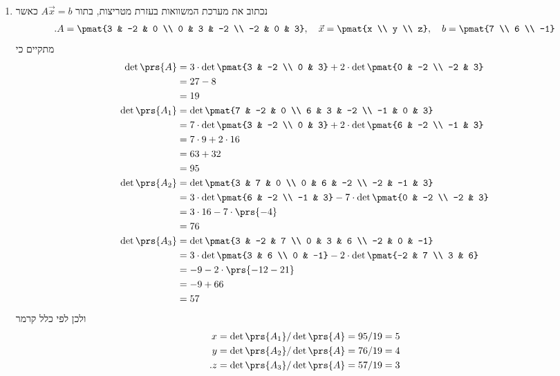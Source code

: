 \documentclass[a4paper,10pt,twoside,openany]{book}
\begin{document}
\begin{solution}
\begin{enumerate}
\item
נכתוב את מערכת המשוואות בעזרת מטריצות, בתור
$A\vec{x} = b$
כאשר
\begin{align*}
\text{.} A = \pmat{3 & -2 & 0 \\ 0 & 3 & -2 \\ -2 & 0 & 3}, \quad
\vec{x} = \pmat{x \\ y \\ z}, \quad
b = \pmat{7 \\ 6 \\ -1}
\end{align*}
מתקיים כי
\begin{align*}
\det\prs{A} &= 3 \cdot \det\pmat{3 & -2 \\ 0 & 3} + 2 \cdot \det \pmat{0 & -2 \\ -2 & 3}
\\&= 27 - 8
\\&= 19
\\
\det\prs{A_1} &= \det\pmat{7 & -2 & 0 \\ 6 & 3 & -2 \\ -1 & 0 & 3}
\\&= 7 \cdot \det \pmat{3 & -2 \\ 0 & 3} + 2 \cdot \det\pmat{6 & -2 \\ -1 & 3}
\\&= 7 \cdot 9 + 2 \cdot 16
\\&= 63 + 32
\\&= 95
\\
\det\prs{A_2} &= \det\pmat{3 & 7 & 0 \\ 0 & 6 & -2 \\ -2 & -1 & 3}
\\&= 3 \cdot \det\pmat{6 & -2 \\ -1 & 3} - 7 \cdot \det\pmat{0 & -2 \\ -2 & 3}
\\&= 3 \cdot 16 - 7 \cdot \prs{-4}
\\&= 76
\\
\det\prs{A_3} &= \det\pmat{3 & -2 & 7 \\ 0 & 3 & 6 \\ -2 & 0 & -1}
\\&= 3 \cdot \det\pmat{3 & 6 \\ 0 & -1} -2 \cdot \det\pmat{-2 & 7 \\ 3 & 6}
\\&= -9 -2 \cdot \prs{-12 - 21}
\\&= -9 + 66
\\&= 57
\end{align*}
ולכן לפי כלל קרמר
\begin{align*}
x &= \det\prs{A_1} / \det\prs{A} = 95/19 = 5 \\
y &= \det\prs{A_2} / \det\prs{A} = 76/19 = 4 \\
\text{.} z &= \det\prs{A_3} / \det\prs{A} = 57/19 = 3
\end{align*}
\end{enumerate}
\end{solution}
\end{document}
